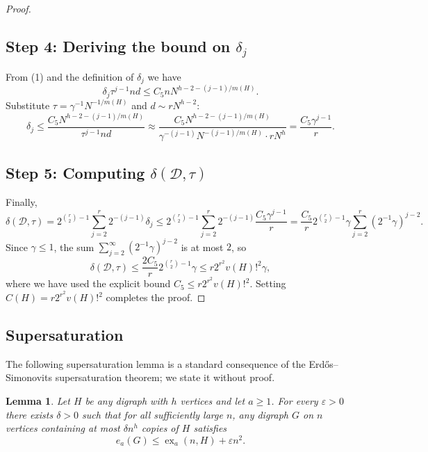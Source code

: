 \documentclass[11pt,a4paper]{article}
\newtheorem{lemma}[theorem]{Lemma}
\DeclareMathOperator{\ex}{ex}
\newcommand{\cD}{\mathcal{D}}
\newcommand{\eps}{\varepsilon}
\newcommand{\del}{\delta}
\begin{document}
\begin{proof}
\subsection*{Step 4: Deriving the bound on $\delta_j$}
From (1) and the definition of $\delta_j$ we have
\[
\delta_j\tau^{j-1}nd \le C_5 n N^{h-2-(j-1)/m(H)}.
\]
Substitute $\tau = \gamma^{-1}N^{-1/m(H)}$ and $d \sim rN^{h-2}$:
\[
\delta_j \le \frac{C_5 N^{h-2-(j-1)/m(H)}}{\tau^{j-1} n d}
   \approx \frac{C_5 N^{h-2-(j-1)/m(H)}}{\gamma^{-(j-1)}N^{-(j-1)/m(H)} \cdot r N^{h}}
   = \frac{C_5 \gamma^{j-1}}{r}.
\]

\subsection*{Step 5: Computing $\delta(\cD,\tau)$}
Finally,
\[
\delta(\cD,\tau) = 2^{\binom{r}{2}-1}\sum_{j=2}^r 2^{-(j-1)}\delta_j
   \le 2^{\binom{r}{2}-1}\sum_{j=2}^r 2^{-(j-1)}\frac{C_5 \gamma^{j-1}}{r}
   = \frac{C_5}{r}2^{\binom{r}{2}-1}\gamma \sum_{j=2}^r (2^{-1}\gamma)^{j-2}.
\]
Since $\gamma\le1$, the sum $\sum_{j=2}^\infty (2^{-1}\gamma)^{j-2}$ is at most $2$, so
\[
\delta(\cD,\tau) \le \frac{2C_5}{r}2^{\binom{r}{2}-1}\gamma \le r2^{r^2}v(H)!^2 \gamma,
\]
where we have used the explicit bound $C_5 \le r2^{r^2}v(H)!^2$. Setting $C(H)=r2^{r^2}v(H)!^2$ completes the proof.
\end{proof}

\subsection{Supersaturation}
The following supersaturation lemma is a standard consequence of the Erd\H{o}s–Simonovits supersaturation theorem; we state it without proof.

\begin{lemma}\label{lem:supersat}
Let $H$ be any digraph with $h$ vertices and let $a\ge1$. For every $\eps>0$ there exists $\del>0$ such that for all sufficiently large $n$, any digraph $G$ on $n$ vertices containing at most $\del n^h$ copies of $H$ satisfies
\[
e_a(G)\le \ex_a(n,H)+\eps n^2.
\]
\end{lemma}
\end{document}
